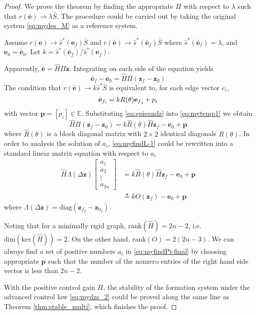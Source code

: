 \documentclass[times]{rncauth}
\newcommand{\be}{\ensuremath \mathbf{e}}
\begin{document}
\begin{proof}
    We prove the theorem by finding the appropriate $\Pi$ with respect to $\lambda$
  such that $r(\bar{\mathbf{e}})\rightarrow \lambda \bar{S}$.
The procedure could be carried out by taking the original system
\eqref{eq:mydes_M} as a reference system.

Assume $r(\mathbf{e})\rightarrow \hat{s}^*(\mathbf{e}_f)\bar{S}$ and
$r(\bar{\mathbf{e}})\rightarrow
\hat{s}^*(\bar{\mathbf{e}}_f)\bar{S}$ where $
\hat{s}^*(\bar{\mathbf{e}}_f)=\lambda$, and
$\mathbf{e}_0=\bar{\mathbf{e}}_0$. Let
$k=\hat{s}^*(\bar{\mathbf{e}}_f)/\hat{s}^*(\mathbf{e}_f)$.

  Apparently, $\dot{\bar{\mathbf{e}}}=\hat{H} \Pi \dot{\mathbf{z}}$. Integrating on each
  side of the equation yields
  \begin{equation}\label{eq:mytemp1}
    \bar{\mathbf{e}}_f-\bar{\mathbf{e}}_0=\hat{H} \Pi (\mathbf{z}_f-\mathbf{z}_0)
  \end{equation}
  The condition that $r(\bar{\mathbf{e}})\rightarrow k \hat{s}^*\bar{S}$ is equivalent
  to, for each edge vector $e_i$,
  \begin{equation}\label{eq:epieandz}
    \bar{\mathbf{e}}_{f_i}=kR(\theta){\be_f}_i+p_i
  \end{equation}
  with vector $\mathbf{p}=[p_i]\in \mathbb{E}$.
Substituting \eqref{eq:epieandz} into \eqref{eq:mytemp1} we
  obtain
  \begin{equation}\label{eq:myfindL-1}
   \hat{H} \Pi
   (\mathbf{z}_f-\mathbf{z}_0)=k\hat{R}(\theta)\hat{H} \mathbf{z}_f-\mathbf{e}_0+\mathbf{p}
  \end{equation}
  where $\hat{R}(\theta)$ is a block diagonal matrix with $2\times
  2$ identical diagonals $R(\theta)$.
In order to analysis the solution of $a_i$, \eqref{eq:myfindL-1}
  could be rewritten into a standard linear matrix equation  with respect to
  $a_i$
\begin{align}\label{eq:myfindPi-final}
  \hat{H} \Lambda(\Delta \mathbf{z})\begin{bmatrix}
    a_1\\a_2\\ \vdots \\a_{2n}
  \end{bmatrix}&=k\hat{R}(\theta)\hat{H}\mathbf{z}_f-\mathbf{e}_0+\mathbf{p}\nonumber\\
&\triangleq kO(\mathbf{z}_f)-\mathbf{e}_0+\mathbf{p}
\end{align}
where $\Lambda(\Delta \mathbf{z})=\text{diag}
({\mathbf{z}_f}_i-{\mathbf{z}_0}_i)$.

Noting that for a minimally rigid graph, $\text{rank}(\hat{H}
)=2n-2$, i.e. $\text{dim}(\text{ker}(\hat{H}))=2$. On the other
hand, $\text{rank}(O)=2(2n-3)$. We can always find a set of positive
numbers $a_i$ in \eqref{eq:myfindPi-final} by choosing appropriate
$\mathbf{p}$ such that the number of the nonzero entries of the
right hand side vector is less than $2n-2$.




With the positive control gain $\Pi$, the stability of the formation
system under the advanced control law \eqref{eq:mydzs_2} could be
proved along the same line as Theorem \ref{thm:stable_multi}, which
finishes the proof.
\end{proof}
\end{document}
